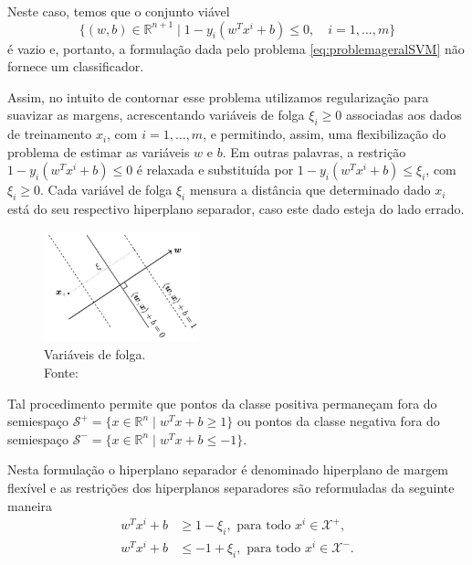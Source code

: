 \documentclass[12pt,a4paper]{scrartcl}
\def\Xset{\mathcal{X}}
\def\RR{\mathds{R}}
\theoremstyle{definition}%
\begin{document}
Neste caso, temos que o conjunto viável
\[
\{ (w,b) \in \RR^{n+1} \mid 1-y_{i}(w^{T}x^{i} + b) \leq 0 , \quad i=1, \ldots , m \}
\]
é vazio e, portanto, a formulação dada pelo problema \eqref{eq:problemageralSVM} não fornece um classificador.

Assim, no intuito de contornar esse problema utilizamos regularização para suavizar as margens, acrescentando variáveis de folga $\xi_{i} \geq 0$ associadas aos dados de treinamento $x_{i}$, com $i=1, \ldots , m$, e permitindo, assim, uma flexibilização do problema de estimar as variáveis $w$ e $b$. Em outras palavras, a restrição $1-y_{i}(w^{T}x^{i} + b) \leq 0$ é relaxada e substituída por $1-y_{i}(w^{T}x^{i} + b) \leq \xi_{i} $, com $\xi_{i} \geq 0$. Cada variável de folga $\xi_{i}$ mensura a distância que determinado dado $x_{i}$ está do seu respectivo hiperplano separador, caso este dado esteja do lado errado.

\begin{figure}[!h] 
	\centering
	\includegraphics[width=0.40\textwidth]{mmlinterpretacao_variavel_xi}
	\caption{Variáveis de folga. \label{fig:variaveis_de_folga} \\ Fonte: \textcite{Faisal2019}}
\end{figure}

Tal procedimento permite que pontos da classe positiva permaneçam fora do semiespaço $\mathcal{S}^{+}=\{x\in \RR^n \mid w^{T}x+b\geq 1\}$ ou pontos da classe negativa fora do semiespaço $\mathcal{S}^{-}=\{x\in \RR^n \mid w^{T}x+b\leq -1\}$. 

Nesta formulação o hiperplano separador é denominado hiperplano de margem flexível e as restrições dos hiperplanos separadores são reformuladas da seguinte maneira 
\begin{align}
w^{T}x^{i}+b &\geq 1 - \xi_{i} , \text{ para  todo } x^{i} \in \Xset^{+}, \label{restricoesCSVM+} \\
w^{T}x^{i}+b &\leq -1 +\xi_{i} , \text{ para  todo } x^{i} \in \Xset^{-}. \label{restricoesCSVM-}
\end{align}
\end{document}
